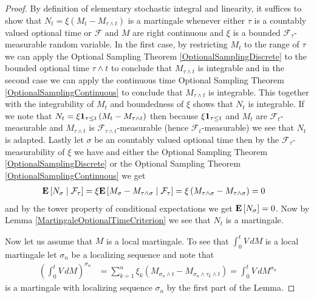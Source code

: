 \begin{proof}
By definition of elementary stochastic integral and linearity, it suffices to show that $N_t = \xi \left (M_t - M_{\tau \wedge t} \right)$ is a martingale whenever either $\tau$ is a countably valued optional time or $\mathcal{F}$ and $M$ are right continuous and $\xi$ is a bounded $\mathcal{F}_\tau$-measurable random variable.  In the first case, by restricting $M_t$ to the range of $\tau$ we can apply the Optional Sampling Theorem \ref{OptionalSamplingDiscrete} to the bounded optional time $\tau \wedge t$ to conclude that $M_{\tau \wedge t}$ is integrable and in the second case we can apply the continuous time Optional Sampling Theorem \ref{OptionalSamplingContinuous} to conclude that $M_{\tau \wedge t}$ is integrable.  This together with the integrability of $M_t$ and boundedness of $\xi$ shows that $N_t$ is integrable.  If we note that $N_t = \xi \characteristic{ \tau \leq t} \left (M_t - M_{\tau \wedge t} \right)$ then because $ \xi \characteristic{ \tau \leq t}$ and $M_t$ are $\mathcal{F}_t$-measurable and $M_{\tau \wedge t}$ is $\mathcal{F}_{\tau \wedge t}$-measurable (hence $\mathcal{F}_t$-measurable) we see that $N_t$ is adapted.  Lastly let $\sigma$ be an countably valued optional time then by the $\mathcal{F}_\tau$-measurability of $\xi$ we have and either the Optional Sampling Theorem \ref{OptionalSamplingDiscrete} or the Optional Sampling Theorem \ref{OptionalSamplingContinuous} we get
\begin{align*}
\cexpectationlong{\mathcal{F}_\tau}{N_\sigma} &= \xi \cexpectationlong{\mathcal{F}_\tau}{M_\sigma - M_{\tau \wedge \sigma}} = \xi \left(M_{\tau \wedge \sigma} - M_{\tau \wedge \sigma} \right) = 0
\end{align*}
and by the tower property of conditional expectations we get $\expectation{N_\sigma} = 0$.  Now by Lemma \ref{MartingaleOptionalTimeCriterion} we see that $N_t$ is a martingale.

Now let us assume that $M$ is a local martingale.  To see that $\int_0^t V \, dM$ is a local martingale let $\sigma_n$ be a localizing sequence and note that
\begin{align*}
\left( \int_0^t V \, dM\right)^{\sigma_n} &= \sum_{k=1}^n \xi_k \left( M_{\sigma_n \wedge t} - M_{\sigma_n \wedge\tau_k \wedge t} \right) = \int_0^t V \, dM^{\sigma_n}
\end{align*}
is a martingale with localizing sequence $\sigma_n$  by the first part of the Lemma.
\end{proof}


